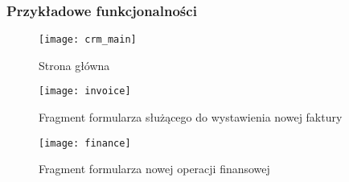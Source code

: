 		\subsubsection{Przykładowe funkcjonalności}	
					
			\begin{figure}[H]
				\centering
				\texttt{[image: crm\_main]}
				\caption{Strona główna}
			\end{figure}
					
			\begin{figure}[H]
				\centering
				\texttt{[image: invoice]}
				\caption{Fragment formularza służącego do wystawienia nowej faktury}
			\end{figure}
					
			\begin{figure}[H]
				\centering
				\texttt{[image: finance]}
				\caption{Fragment formularza nowej operacji finansowej}
			\end{figure}
